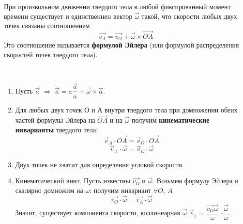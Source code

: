 \begin{theorem}
    При произвольном движении твердого тела в любой фиксированный момент времени существует и единственнен вектор $\vec{\omega}$ такой, что скорости любых двух точек связаны соотношением
    \[
    \vec{v_A} = \vec{v_O} + \vec{\omega} \times \vec{OA}
    \]
    Это соотношение называется \textbf{формулой Эйлера} (или формулой распределения скоростей точек твердого тела).
\end{theorem}
\begin{corollary}
    \tab\\
    \begin{enumerate}
        \item Пусть $\vec{a}$ $\Longrightarrow$ $\dot{\vec{a}} = \dot{a}\dfrac{\vec{a}}{a} + \vec{\omega} \times \vec{a}$.
        \item Для любых двух точек О и А внутри твердого тела при домножении обеих частей формулы Эйлера на $\vec{OA}$ и на $\vec{\omega}$ получим \textbf{кинематические инварианты} твердого тела:
        \[
        \vec{v}_A \cdot \vec{OA} = \vec{v}_O \cdot \vec{OA}
        \]
        \[
        \vec{v}_A \cdot \vec{\omega} = \vec{v}_O \cdot \vec{\omega}
        \]
        \item Двух точек не хватит для определения угловой скорости.
        \item \underline{Кинематический винт}.
        Пусть известны $\vec{v_O}$ и $\vec{\omega}$. Возьмем формулу Эйлера и скалярно домножим на $\omega$: получим инвариант $\forall O,~A$
        \[
        \vec{v_O}\cdot \vec{\omega} = \vec{v_A}\cdot \vec{\omega}
        \]
        Значит, существует компонента скорости, коллинеарная $\vec{\omega}$ $\vec{v}_{||} = \dfrac{\vec{v_O}\vec{\omega}}{\omega}\cdot \dfrac{\vec{\omega}}{\omega}$.\\
        

\end{enumerate}
\end{corollary}
